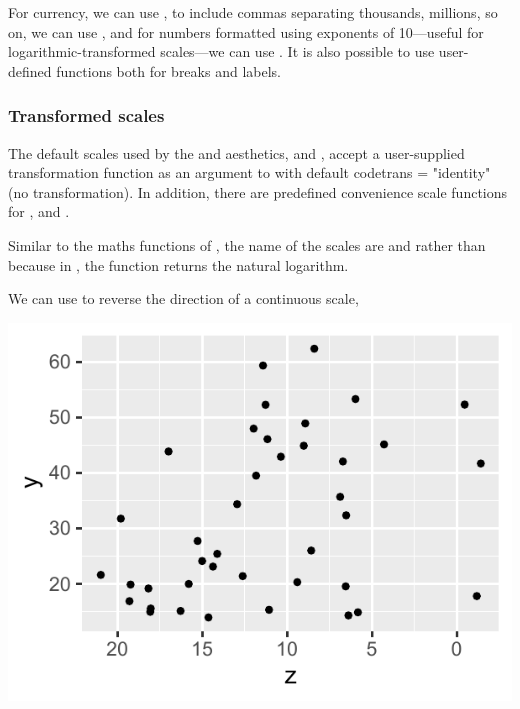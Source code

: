 \documentclass[krantz2]{krantz}\usepackage{knitr}
\begin{document}
For currency, we can use , to include commas separating thousands, millions, so on, we can use , and for numbers formatted using exponents of 10---useful for logarithmic-transformed scales---we can use . It is also possible to use user-defined functions both for breaks and labels.

\subsubsection{Transformed scales}\label{sec:plot:scales:trans}

The default scales used by the  and  aesthetics,  and , accept a user-supplied transformation function as an argument to  with default code{trans = "identity"} (no transformation). In addition, there are predefined convenience scale functions for ,  and .

\begin{warningbox}
  Similar to the maths functions of \Rlang, the name of the scales are  and  rather than  because in \Rlang, the function  returns the natural logarithm.
\end{warningbox}

We can use  to reverse the direction of a continuous scale,

\begin{knitrout}\footnotesize
{}\color{fgcolor}\begin{kframe}
\begin{alltt}
  \hlopt{+}
  \hlstd{()} \hlopt{+}
  \hlstd{()}
\end{alltt}
\end{kframe}

{\centering \includegraphics[width=.54\textwidth]{figure/pos-scale-trans-01-1} 

}


\end{knitrout}
\end{document}
